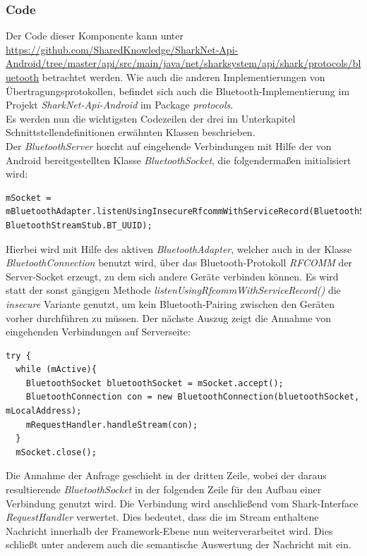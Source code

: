 \subsubsection{Code}
Der Code dieser Komponente kann unter \url{https://github.com/SharedKnowledge/SharkNet-Api-Android/tree/master/api/src/main/java/net/sharksystem/api/shark/protocols/bluetooth} betrachtet werden. Wie auch die anderen Implementierungen von Über\-tra\-gungs\-pro\-to\-kol\-len, befindet sich auch die Bluetooth-Implementierung im Projekt \textit{SharkNet-Api-Android} im Package \textit{protocols}. 
\\Es werden nun die wichtigsten Codezeilen der drei im Unterkapitel Schnittstellendefinitionen erwähnten Klassen beschrieben.
\\Der \textit{BluetoothServer} horcht auf eingehende Verbindungen mit Hilfe der von Android bereitgestellten Klasse \textit{BluetoothSocket}, die folgendermaßen initialisiert wird:\newpage
 \lstset{language=Java, caption=Initialisierung des Bluetooth-Server-Sockets, label=DescriptiveLabel, numbers=left, numbersep=1em, breaklines=true, basicstyle=\small}
\begin{lstlisting}
mSocket = mBluetoothAdapter.listenUsingInsecureRfcommWithServiceRecord(BluetoothStreamStub.BT_NAME, BluetoothStreamStub.BT_UUID);
\end{lstlisting}
Hierbei wird mit Hilfe des aktiven \textit{BluetoothAdapter}, welcher auch in der Klasse \textit{BluetoothConnection} benutzt wird, über das Bluetooth-Protokoll \textit{RFCOMM} der Server-Socket erzeugt, zu dem sich andere Geräte verbinden können. Es wird statt der sonst gängigen Methode \textit{listenUsingRfcommWithServiceRecord()} die \textit{insecure} Variante genutzt, um kein Bluetooth-Pairing zwischen den Geräten vorher durchführen zu müssen. Der nächste Auszug zeigt die Annahme von eingehenden Verbindungen auf Serverseite:\newline
 \lstset{language=Java, caption=Serverseitige Annahme der Bluetooth-Verbindungen (Auszug), label=DescriptiveLabel, numbers=left, numbersep=1em, breaklines=true, basicstyle=\small}
\begin{lstlisting}
try {
  while (mActive){
    BluetoothSocket bluetoothSocket = mSocket.accept();
    BluetoothConnection con = new BluetoothConnection(bluetoothSocket, mLocalAddress);
    mRequestHandler.handleStream(con);
  }
  mSocket.close();
\end{lstlisting}
Die Annahme der Anfrage geschieht in der dritten Zeile, wobei der daraus resultierende \textit{BluetoothSocket} in der folgenden Zeile für den Aufbau einer Verbindung genutzt wird. Die Verbindung wird anschließend vom Shark-Interface \textit{RequestHandler} verwertet. Dies bedeutet, dass die im Stream enthaltene Nachricht innerhalb der Framework-Ebene nun weiterverarbeitet wird. Dies schließt unter anderem auch die semantische Auswertung der Nachricht mit ein.
